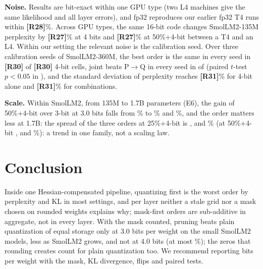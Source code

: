 \documentclass{esannV2}
\newcommand{\TBD}[1]{\textbf{[#1]}}
\newif\ifEfive  \Efivetrue
\providecommand{\resHwDeltaSmolSmallQuantBFourPct}{\TBD{R27}}
\providecommand{\resHwDeltaSmolSmallSFiftyBFourPQPct}{\TBD{R27}}
\providecommand{\resReproThirtyTwoMaxAbsPct}{\TBD{R28}}
\providecommand{\resSeedBestStable}{\TBD{R30}}
\providecommand{\resSeedBestCells}{\TBD{R30}}
\providecommand{\resSeedSdMaxSinglePct}{\TBD{R31}}
\providecommand{\resSeedSdMaxCombinedPct}{\TBD{R31}}
\begin{document}
\textbf{Noise.} Results are bit-exact within one GPU type (two L4 machines give
the same likelihood and all \resDetLayers{} layer errors), and fp32 reproduces
our earlier fp32 T4 runs within \resReproThirtyTwoMaxAbsPct\%.
Across GPU types, the same 16-bit code changes SmolLM2-135M perplexity by
\resHwDeltaSmolSmallQuantBFourPct\% at 4 bits and
\resHwDeltaSmolSmallSFiftyBFourPQPct\% at 50\%+4-bit between a T4 and an L4.
Within our setting the relevant noise is the calibration seed.\ifEfive{} Over
three calibration seeds of SmolLM2-360M, the best order is the same in every
seed in \resSeedBestStable{} of \resSeedBestCells{} 4-bit cells, joint beats
P$\to$Q in every seed in \resSeedPairJointPQAllSeeds{} of
\resSeedPairJointPQCells{} (paired $t$-test $p<0.05$ in
\resSeedPairJointPQSig), and the
standard deviation of perplexity reaches \resSeedSdMaxSinglePct\% for 4-bit
alone and \resSeedSdMaxCombinedPct\% for combinations.\fi

\textbf{Scale.} Within SmolLM2, from 135M to 1.7B parameters (E6), the gain
of 50\%+4-bit over 3-bit at 3.0 bits falls from
\resFrontierThreeGainSmolSmallPct\% to \resFrontierThreeGainSmolMediumPct\% and
\resFrontierThreeGainSmolLargePct\%, and the order matters less at 1.7B: the spread of
the three orders at 25\%+4-bit is \resScaleSpreadSmolSmallSTwentyFiveBFourPct,
\resScaleSpreadSmolMediumSTwentyFiveBFourPct{} and
\resScaleSpreadSmolLargeSTwentyFiveBFourPct\% (at 50\%+4-bit
\resScaleSpreadSmolSmallSFiftyBFourPct, \resScaleSpreadSmolMediumSFiftyBFourPct{}
and \resScaleSpreadSmolLargeSFiftyBFourPct\%): a trend in one family, not a
scaling law.

\section{Conclusion}

Inside one Hessian-compensated pipeline, quantizing first is the worst order
by perplexity and KL in most settings, and per layer neither a stale grid nor
a mask chosen on rounded weights explains why; mask-first orders are
sub-additive in aggregate, not in every layer. With the mask counted, pruning
beats plain quantization of equal storage only at 3.0 bits per weight on the
small SmolLM2 models, less as SmolLM2 grows, and not at 4.0 bits (at most
\resFrontierFourGainMaxPct\%); the zeros
that rounding creates count for plain quantization too. We recommend reporting bits per weight with the mask, KL divergence,
flips and paired tests.

\begin{footnotesize}


\end{footnotesize}
\end{document}
